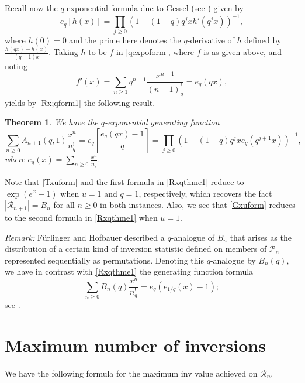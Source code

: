 \documentclass[11pt,a4paper]{article}
\newtheorem{theorem}{Theorem}[section]
\begin{document}
Recall now the $q$-exponential formula due to Gessel (see \cite[Proposition 3.5]{Ges}) given by
\begin{equation}\label{qexpoform}
e_q[h(x)]=\prod_{j\geq0}\left(1-(1-q)q^jxh'(q^jx)\right)^{-1},
\end{equation}
where $h(0)=0$ and the prime here denotes the $q$-derivative of $h$ defined by $\frac{h(qx)-h(x)}{(q-1)x}$.  Taking $h$ to be $f$ in \eqref{qexpoform}, where $f$ is as given above, and noting
$$f'(x)=\sum_{n\geq1}q^{n-1}\frac{x^{n-1}}{(n-1)_q^!}=e_q(qx),$$
yields by \eqref{Rx;qform1} the following result.

\begin{theorem}\label{Rxqthm}
We have the $q$-exponential generating function
\begin{equation}\label{Rxqthme1}
\sum_{n\geq0}A_{n+1}(q,1)\frac{x^n}{n_q^!}=e_q\left[\frac{e_q(qx)-1}{q}\right]=\prod_{j\geq0}\left(1-(1-q)q^jxe_q(q^{j+1}x)\right)^{-1},
\end{equation}
where $e_q(x)=\sum_{n\geq0}\frac{x^n}{n_q^!}$.
\end{theorem}

Note that  \eqref{Txuform} and the first formula in \eqref{Rxqthme1} reduce to $\exp(e^x-1)$ when $u=1$ and $q=1$, respectively, which recovers the fact $|\mathcal{R}_{n+1}|=B_n$ for all $n \geq0$ in both instances. Also, we see that \eqref{Gxuform} reduces to the second formula in \eqref{Rxqthme1} when $u=1$. \medskip

\noindent \emph{Remark:} F\"{u}rlinger and Hofbauer \cite{FH} described a $q$-analogue of $B_n$ that arises as the distribution of a certain kind of inversion statistic defined on members of $\mathcal{P}_n$ represented sequentially as permutations.   Denoting this $q$-analogue by $B_n(q)$, we have in contrast with \eqref{Rxqthme1} the generating function formula
$$\sum_{n\geq0}B_n(q)\frac{x^n}{n_q^!}=e_q(e_{1/q}(x)-1);$$
see \cite[Equation~(2.10)]{FH}.

\section{Maximum number of inversions}

We have the following formula for the maximum inv value achieved on $\mathcal{R}_n$.
\end{document}
